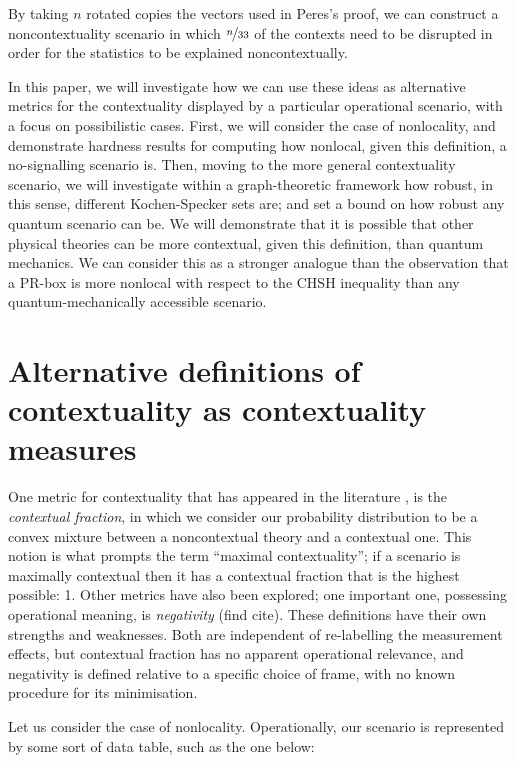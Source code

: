 \documentclass{amsart}
\theoremstyle{definition}
\begin{document}
By taking $n$ rotated copies the vectors used in Peres's proof, we can construct a noncontextuality scenario in which $\nicefrac{n}{33}$ of the contexts need to be disrupted in order for the statistics to be explained noncontextually.

In this paper, we will investigate how we can use these ideas as alternative metrics for the contextuality displayed by a particular operational scenario, with a focus on possibilistic cases. First, we will consider the case of nonlocality, and demonstrate hardness results for computing how nonlocal, given this definition, a no-signalling scenario is. Then, moving to the more general contextuality scenario, we will investigate within a graph-theoretic framework how robust, in this sense, different Kochen-Specker sets are; and set a bound on how robust any quantum scenario can be. We will demonstrate that it is possible that other physical theories can be more contextual, given this definition, than quantum mechanics. We can consider this as a stronger analogue than the observation that a PR-box is more nonlocal with respect to the CHSH inequality than any quantum-mechanically accessible scenario.



\section{Alternative definitions of contextuality as contextuality measures}

One metric for contextuality that has appeared in the literature \cite{Abra2011, DeSi2015}, is the \emph{contextual fraction}, in which we consider our probability distribution to be a convex mixture between a noncontextual theory and a contextual one. This notion is what prompts the term ``maximal contextuality''; if a scenario is maximally contextual then it has a contextual fraction that is the highest possible: 1. Other metrics have also been explored; one important one, possessing operational meaning, is \emph{negativity} (find cite). These definitions have their own strengths and weaknesses. Both are independent of re-labelling the measurement effects, but contextual fraction has no apparent operational relevance, and negativity is defined relative to a specific choice of frame, with no known procedure for its minimisation.

Let us consider the case of nonlocality. Operationally, our scenario is represented by some sort of data table, such as the one below:
\end{document}

